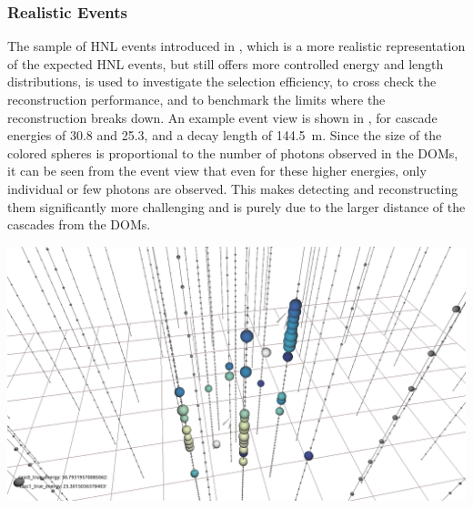 \subsubsection{Realistic Events}

The sample of HNL events introduced in , which is a more realistic representation of the expected HNL events, but still offers more controlled energy and length distributions, is used to investigate the selection efficiency, to cross check the reconstruction performance, and to benchmark the limits where the reconstruction breaks down. An example event view is shown in , for cascade energies of \SI{30.8}{\gev} and \SI{25.3}{\gev}, and a decay length of \SI{144.5}{\meter}. Since the size of the colored spheres is proportional to the number of photons observed in the DOMs, it can be seen from the event view that even for these higher energies, only individual or few photons are observed. This makes detecting and reconstructing them significantly more challenging and is purely due to the larger distance of the cascades from the DOMs.

\begin{marginfigure}
    \centering
    \includegraphics[trim=230 45 230 65, clip]{figures/model_independent_simulation/diagonal_e0_30.8_e1_25.3_v0.png}
    \caption[Event view of a realistic double-cascade event]{Event view of a realistic double-cascade event, with cascade energies of \SI{30.8}{\gev} and \SI{25.3}{\gev}, and a decay length of \SI{144.5}{\meter}. The colored spheres show the DOMs that have observed light, where the size is proportional to the number of observed photons and the color indicates the time (yellow is early, blue is late). The strings are shown as black lines, with small spheres indicating the DOM positions, and the true cascade vertices and directions are shown as white spheres with white arrows.}
\end{marginfigure}


